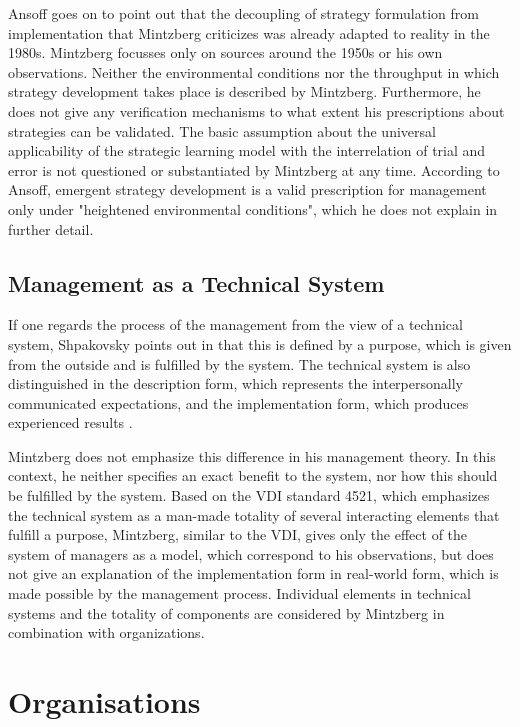 \documentclass[a4paper,12pt]{article}
\begin{document}
Ansoff goes on to point out that the decoupling of strategy formulation from
implementation that Mintzberg criticizes was already adapted to reality in the
1980s. Mintzberg focusses only on sources around the 1950s or his own
observations. Neither the environmental conditions nor the throughput in which
strategy development takes place is described by Mintzberg. Furthermore, he
does not give any verification mechanisms to what extent his prescriptions
about strategies can be validated. The basic assumption about the universal
applicability of the strategic learning model with the interrelation of trial
and error is not questioned or substantiated by Mintzberg at any time.
According to Ansoff, emergent strategy development is a valid prescription for
management only under "heightened environmental conditions", which he does not
explain in further detail.

\subsection{Management as a Technical System}

If one regards the process of the management from the view of a technical
system, Shpakovsky points out in \cite{shpakovsky} that this is defined by a
purpose, which is given from the outside and is fulfilled by the system. The
technical system is also distinguished in the description form, which
represents the interpersonally communicated expectations, and the
implementation form, which produces experienced results \cite{graebe:2020}.

Mintzberg does not emphasize this difference in his management theory. In this
context, he neither specifies an exact benefit to the system, nor how this
should be fulfilled by the system. Based on the VDI standard 4521, which
emphasizes the technical system as a man-made totality of several interacting
elements that fulfill a purpose, Mintzberg, similar to the VDI, gives only the
effect of the system of managers as a model, which correspond to his
observations, but does not give an explanation of the implementation form in
real-world form, which is made possible by the management process. Individual
elements in technical systems and the totality of components are considered by
Mintzberg in combination with organizations.

\section{Organisations}
\end{document}
